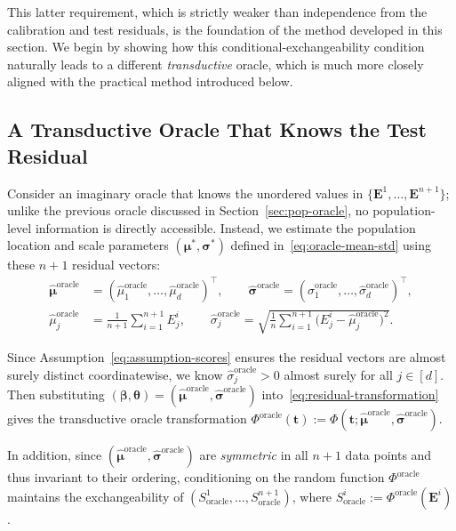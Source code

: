 This latter requirement, which is strictly weaker than independence from the calibration and test residuals, is the foundation of the method developed in this section.
We begin by showing how this conditional-exchangeability condition naturally leads to a different \emph{transductive} oracle, which is much more closely aligned with the practical method introduced below.

\subsection{A Transductive Oracle That Knows the Test Residual}
\label{sec:method-oracle}

Consider an imaginary oracle that knows the unordered values in $\{\mathbf E^1,\ldots,\mathbf E^{n+1}\}$; unlike the previous oracle discussed in Section~\ref{sec:pop-oracle}, no population-level information is directly accessible. Instead, we estimate the population location and scale parameters $(\boldsymbol\mu^*,\boldsymbol\sigma^*)$ defined in~\eqref{eq:oracle-mean-std} using these $n+1$ residual vectors:
\begin{equation}\label{eq:transductive-oracle-mean-std}
\begin{aligned}
\hat{\boldsymbol\mu}^{\mathrm{oracle}}
&=
(\hat\mu_1^{\mathrm{oracle}},\ldots,\hat\mu_d^{\mathrm{oracle}})^\top,
\qquad
\hat{\boldsymbol\sigma}^{\mathrm{oracle}}
=
(\hat\sigma_1^{\mathrm{oracle}},\ldots,\hat\sigma_d^{\mathrm{oracle}})^\top,
\\
\hat\mu_j^{\mathrm{oracle}}
&=
\frac1{n+1}\sum_{i=1}^{n+1}E_j^i,
\qquad
\hat\sigma_j^{\mathrm{oracle}}
=
\sqrt{
\frac1n\sum_{i=1}^{n+1}
\!\bigl(E_j^i-\hat\mu_j^{\mathrm{oracle}}\bigr)^2
}.
\end{aligned}
\end{equation}

Since Assumption~\ref{eq:assumption-scores} ensures the residual vectors are almost surely distinct coordinatewise, we know $\hat\sigma_j^{\mathrm{oracle}}>0$ almost surely for all $j\in[d]$.
Then substituting $(\boldsymbol\beta,\boldsymbol\theta)=(\hat{\boldsymbol\mu}^{\mathrm{oracle}},\hat{\boldsymbol\sigma}^{\mathrm{oracle}})$ into~\eqref{eq:residual-transformation} gives the transductive oracle transformation
$\Phi^{\mathrm{oracle}}(\mathbf t):=\Phi(\mathbf t;\hat{\boldsymbol\mu}^{\mathrm{oracle}},\hat{\boldsymbol\sigma}^{\mathrm{oracle}})$.

In addition, since $(\hat{\boldsymbol\mu}^{\mathrm{oracle}},\hat{\boldsymbol\sigma}^{\mathrm{oracle}})$ are \emph{symmetric} in all $n+1$ data points and thus invariant to their ordering, conditioning on the random function $\Phi^{\mathrm{oracle}}$ maintains the exchangeability of $(S^1_{\mathrm{oracle}},\ldots,S^{n+1}_{\mathrm{oracle}})$, where $S^i_{\mathrm{oracle}}:=\Phi^{\mathrm{oracle}}(\mathbf E^i)$.

